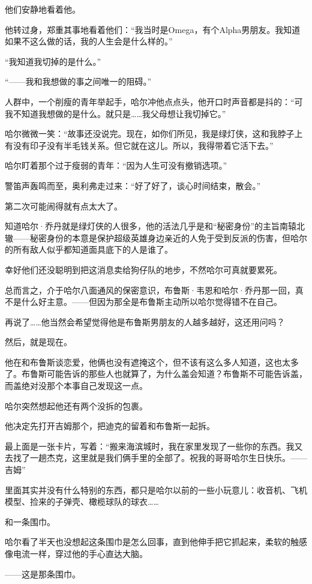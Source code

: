 \documentclass[../main]{subfiles}
\begin{document}
他们安静地看着他。

他转过身，郑重其事地看着他们：“我当时是Omega，有个Alpha男朋友。我知道如果不这么做的话，我的人生会是什么样的。”

“我知道我切掉的是什么。”

“——我和我想做的事之间唯一的阻碍。”

人群中，一个削瘦的青年举起手，哈尔冲他点点头，他开口时声音都是抖的：“可我不知道我想做的是什么。就只是……我父母想让我切掉它。”

哈尔微微一笑：“故事还没说完。现在，如你们所见，我是绿灯侠，这和我脖子上有没有印子没有半毛钱关系。但它就在这儿。所以，我得带着它活下去。”

哈尔盯着那个过于瘦弱的青年：“因为人生可没有撤销选项。”

警笛声轰鸣而至，奥利弗走过来：“好了好了，谈心时间结束，散会。”

第二次可能闹得就有点太大了。

知道哈尔·乔丹就是绿灯侠的人很多，他的活法几乎是和“秘密身份”的主旨南辕北辙——秘密身份的本意是保护超级英雄身边亲近的人免于受到反派的伤害，但哈尔的所有敌人似乎都知道面具底下的人是谁了。

幸好他们还没聪明到把这消息卖给狗仔队的地步，不然哈尔可真就要累死。

总而言之，介于哈尔八面通风的保密意识，布鲁斯·韦恩和哈尔·乔丹那一回，真不是什么好主意。——但因为那全是布鲁斯主动所以哈尔觉得错不在自己。

再说了……他当然会希望觉得他是布鲁斯男朋友的人越多越好，这还用问吗？

然后，就是现在。

他在和布鲁斯谈恋爱，他俩也没有遮掩这个，但不该有这么多人知道，这也太多了。布鲁斯可能告诉的那些人也就算了，为什么盖会知道？布鲁斯不可能告诉盖，而盖绝对没那个本事自己发现这一点。

哈尔突然想起他还有两个没拆的包裹。

他决定先打开吉姆那个，把迪克的留着和布鲁斯一起拆。

最上面是一张卡片，写着：“搬来海滨城时，我在家里发现了一些你的东西。我又去找了一趟杰克，这里就是我们俩手里的全部了。祝我的哥哥哈尔生日快乐。——吉姆”

里面其实并没有什么特别的东西，都只是哈尔以前的一些小玩意儿：收音机、飞机模型、捡来的子弹壳、橄榄球队的球衣……

和一条围巾。

哈尔看了半天也没想起这条围巾是怎么回事，直到他伸手把它抓起来，柔软的触感像电流一样，穿过他的手心直达大脑。

——这是那条围巾。
\end{document}
